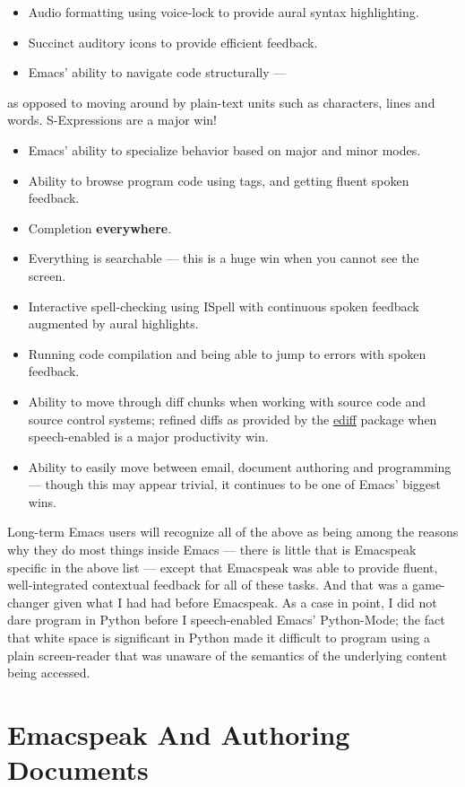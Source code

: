 \documentclass[11pt]{article}
\begin{document}
\begin{itemize}
\item Audio formatting using voice-lock to provide aural syntax
highlighting.
\item Succinct auditory icons to provide efficient feedback.
\item Emacs' ability to navigate code structurally   —
\end{itemize}
as opposed to
  moving around by plain-text units such as characters, lines
  and words. S-Expressions are a major win!
\begin{itemize}
\item Emacs' ability to specialize behavior based on major and
minor modes.
\item Ability to browse program code using  tags, and getting
fluent spoken feedback.
\item Completion \textbf{everywhere}.
\item Everything is searchable   —   this is a huge win when you
cannot see the screen.
\item Interactive spell-checking using ISpell with continuous
spoken feedback augmented by  aural highlights.
\item Running code compilation  and being able to jump to errors
with spoken feedback.
\item Ability to move through diff chunks when working with source
code and source control systems;  refined diffs as provided
by the \uline{ediff} package when speech-enabled is a major
productivity win.
\item Ability to easily move between email, document authoring and
programming   —   though this may appear trivial, it continues
to be one of Emacs' biggest wins.
\end{itemize}


Long-term Emacs users will recognize all of the above as  being
among the reasons why they do most things inside Emacs   —   there
is little that is Emacspeak specific in the above list   —   except
that Emacspeak was able to provide fluent, well-integrated
contextual feedback for all of these tasks. And that was a
game-changer given what I had had before Emacspeak. As a case in
point, I did not dare program in Python before  I speech-enabled
Emacs' Python-Mode; the fact that white space is significant in
Python made it difficult to program using a plain screen-reader
that was unaware of the semantics of the underlying content being accessed.

\section{Emacspeak And Authoring Documents}
\label{sec-6}
\end{document}
